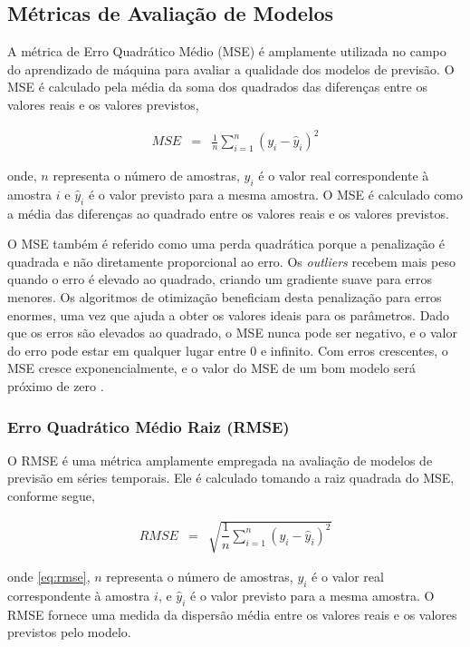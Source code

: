 \subsection{M\'etricas de Avalia\c c\~ao de Modelos}\label{subsec:metrica}

A métrica de Erro Quadrático Médio (MSE) é amplamente utilizada no campo do aprendizado de máquina para avaliar a qualidade dos modelos de previsão. O MSE é calculado pela média da soma dos quadrados das diferenças entre os valores reais e os valores previstos,

\begin{eqnarray}
	MSE &=& \frac{1}{n} \sum_{i=1}^{n} (y_i - \hat{y}_i)^2 \label{eq:mse}
\end{eqnarray}

\noindent onde, $n$ representa o número de amostras, $y_i$ é o valor real correspondente à amostra $i$ e $\hat{y}_i$ é o valor previsto para a mesma amostra. O MSE é calculado como a média das diferenças ao quadrado entre os valores reais e os valores previstos.

O MSE também é referido como uma perda quadrática porque a penalização é quadrada e não diretamente proporcional ao erro. Os \textit{outliers} recebem mais peso quando o erro é elevado ao quadrado, criando um gradiente suave para erros menores. Os algoritmos de otimização beneficiam desta penalização para erros enormes, uma vez que ajuda a obter os valores ideais para os parâmetros. Dado que os erros são elevados ao quadrado, o MSE nunca pode ser negativo, e o valor do erro pode estar em qualquer lugar entre 0 e infinito. Com erros crescentes, o MSE cresce exponencialmente, e o valor do MSE de um bom modelo será próximo de zero \cite{jadon2022comprehensive}.

\subsubsection{Erro Quadr\'atico M\'edio Raiz (RMSE)}

O RMSE é uma métrica amplamente empregada na avaliação de modelos de previsão em séries temporais. Ele é calculado tomando a raiz quadrada do MSE, conforme segue,

\begin{eqnarray}
	RMSE &=& \sqrt{\dfrac{1}{n} \sum_{i=1}^{n} (y_i - \hat{y}_i)^2} \label{eq:rmse}
\end{eqnarray}

\noindent onde \eqref{eq:rmse}, $n$ representa o número de amostras, $y_i$ é o valor real correspondente à amostra $i$, e $\hat{y}_i$ é o valor previsto para a mesma amostra. O RMSE fornece uma medida da dispersão média entre os valores reais e os valores previstos pelo modelo.


